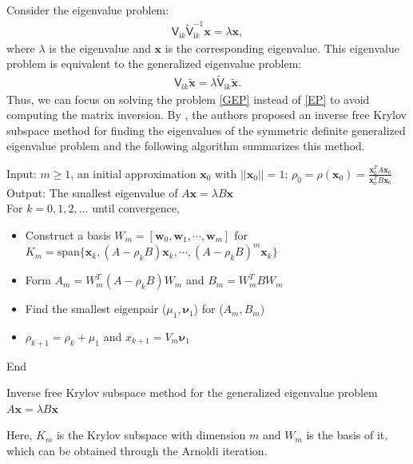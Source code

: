 Consider the eigenvalue problem: 
\begin{align} \label{EP}
    \mathsf{V}_{\mathrm{i}k}\tilde{\mathsf{V}}_{\mathrm{i}k}^{-1}\boldsymbol{x} = \lambda\boldsymbol{x},
\end{align}
where $\lambda$ is the eigenvalue and $\boldsymbol{x}$ is the corresponding eigenvalue. This eigenvalue problem is equivalent to the generalized eigenvalue problem:
\begin{align}\label{GEP}
    \mathsf{V}_{\mathrm{i}k}\tilde{\boldsymbol{x}} = \lambda \tilde{\mathsf{V}}_{\mathrm{i}k}\tilde{\boldsymbol{x}}.
\end{align}
Thus, we can focus on solving the problem \eqref{GEP} instead of \eqref{EP} to avoid computing the matrix inversion. By \cite{golub2002inverse}, the authors 
proposed an inverse free Krylov subspace method for finding the eigenvalues of the symmetric definite generalized eigenvalue problem and the following 
algorithm summarizes this method.

\begin{algorithm}[H]
    \SetAlgoLined
    Input: $m\geq 1$, an initial approximation $\boldsymbol{x}_{0}$ with $||\boldsymbol{x}_{0}|| = 1$; $\rho_{0} = \rho(\boldsymbol{x}_{0}) = \frac{\boldsymbol{x}_{0}^{T}A\boldsymbol{x}_{0}}{\boldsymbol{x}_{0}^{T}B\boldsymbol{x}_{0}}$\\
    Output: The smallest eigenvalue of $A\boldsymbol{x} = \lambda B\boldsymbol{x}$\\
    
    For $k = 0,1,2,...$ until convergence,
    \begin{itemize}
        \item Construct a basis $W_{m} = [\boldsymbol{w}_{0}, \boldsymbol{w}_{1}, \cdots, \boldsymbol{w}_{m}]$ for $K_{m} = \text{span}\{\boldsymbol{x}_{k}, (A - \rho_{k}B)\boldsymbol{x}_{k}, \cdots, (A - \rho_{k}B)^{m}\boldsymbol{x}_{k}\}$
        \item Form $A_{m} = W_{m}^{T}(A - \rho_{k}B)W_{m}$ and $B_{m} = W_{m}^{T}BW_{m}$
        \item Find the smallest eigenpair ($\mu_{1}, \boldsymbol{\nu}_{1}$) for ($A_{m}, B_{m}$)
        \item $\rho_{k+1} = \rho_{k} + \mu_{1}$ and $x_{k+1} = V_{m}\boldsymbol{\nu}_{1}$
    \end{itemize}
    End
     \caption{Inverse free Krylov subspace method for the generalized eigenvalue problem $A\boldsymbol{x} = \lambda B\boldsymbol{x}$}
    \end{algorithm}
    Here, $K_{m}$ is the Krylov subspace with dimension $m$ and $W_{m}$ is the basis of it, which can be obtained through the Arnoldi iteration. 
    
